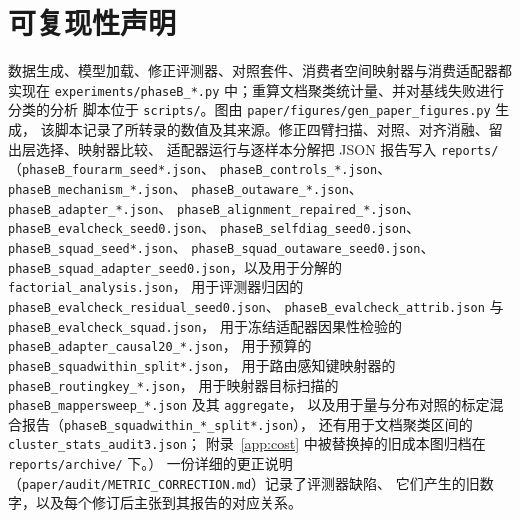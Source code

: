 \documentclass[11pt]{article}
\begin{document}
\section{可复现性声明}
\begin{sloppypar}
数据生成、模型加载、修正评测器、对照套件、消费者空间映射器与消费适配器都实现在
\texttt{experiments/phaseB\_*.py} 中；重算文档聚类统计量、并对基线失败进行分类的分析
脚本位于 \texttt{scripts/}。图由 \texttt{paper/figures/gen\_paper\_figures.py} 生成，
该脚本记录了所转录的数值及其来源。修正四臂扫描、对照、对齐消融、留出层选择、映射器比较、
适配器运行与逐样本分解把 JSON 报告写入 \texttt{reports/}
（\texttt{phaseB\_fourarm\_seed*.json}、
\texttt{phaseB\_controls\_*.json}、
\texttt{phaseB\_mechanism\_*.json}、
\texttt{phaseB\_outaware\_*.json}、
\texttt{phaseB\_adapter\_*.json}、
\texttt{phaseB\_alignment\_repaired\_*.json}、
\texttt{phaseB\_evalcheck\_seed0.json}、
\texttt{phaseB\_selfdiag\_seed0.json}、
\texttt{phaseB\_squad\_seed*.json}、
\texttt{phaseB\_squad\_outaware\_seed0.json}、
\texttt{phaseB\_squad\_adapter\_seed0.json}，以及用于分解的
\texttt{factorial\_analysis.json}，
用于评测器归因的
\texttt{phaseB\_evalcheck\_residual\_seed0.json}、
\texttt{phaseB\_evalcheck\_attrib.json} 与
\texttt{phaseB\_evalcheck\_squad.json}，
用于冻结适配器因果性检验的 \texttt{phaseB\_adapter\_causal20\_*.json}，
用于预算的 \texttt{phaseB\_squadwithin\_split*.json}，
用于路由感知键映射器的 \texttt{phaseB\_routingkey\_*.json}，
用于映射器目标扫描的 \texttt{phaseB\_mappersweep\_*.json} 及其 \texttt{aggregate}，
以及用于量与分布对照的标定混合报告（\texttt{phaseB\_squadwithin\_*\_split*.json}），
还有用于文档聚类区间的 \texttt{cluster\_stats\_audit3.json}；
附录~\ref{app:cost} 中被替换掉的旧成本图归档在 \texttt{reports/archive/} 下。）
一份详细的更正说明（\texttt{paper/audit/METRIC\_CORRECTION.md}）记录了评测器缺陷、
它们产生的旧数字，以及每个修订后主张到其报告的对应关系。
\end{sloppypar}
\end{document}

